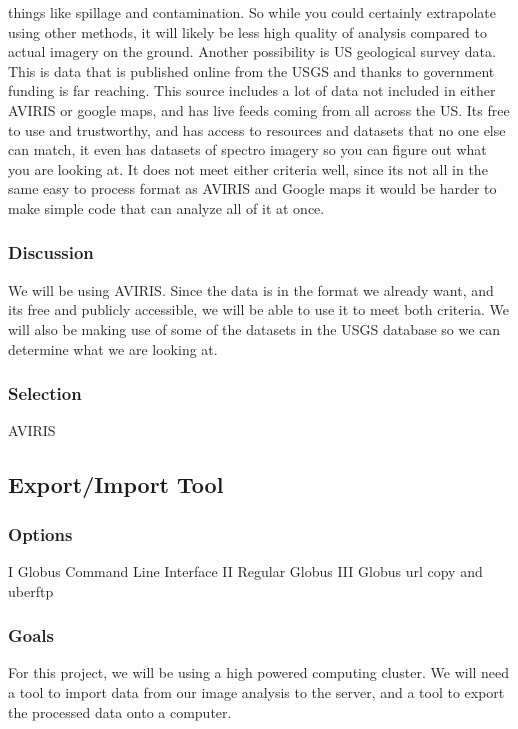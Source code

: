 \documentclass[10pt,draftclsnofoot,onecolumn,journal,compsoc]{IEEEtran}
\begin{document}
things like spillage and contamination. So while you could certainly extrapolate using other methods, it will
likely be less high quality of analysis compared to actual imagery on the ground.
Another possibility is US geological survey data. This is data that is published online from the USGS and
thanks to government funding is far reaching. This source includes a lot of data not included in either AVIRIS or
google maps, and has live feeds coming from all across the US. Its free to use and trustworthy, and has access to
resources and datasets that no one else can match, it even has datasets of spectro imagery so you can figure out
what you are looking at. It does not meet either criteria well, since its not all in the same easy to process format
as AVIRIS and Google maps it would be harder to make simple code that can analyze all of it at once. \cite{2}

\subsubsection{Discussion}
We will be using AVIRIS. Since the data is in the format we already want, and its free and publicly accessible,
we will be able to use it to meet both criteria. We will also be making use of some of the datasets in the USGS
database so we can determine what we are looking at.

\subsubsection{Selection}
\noindent AVIRIS

\subsection{Export/Import Tool}

\subsubsection{Options}
\noindent I Globus Command Line Interface \newline
\noindent II Regular Globus \newline
\noindent III Globus url copy and uberftp

\subsubsection{Goals}
\noindent For this project, we will be using a high powered computing cluster. We will need a tool to import data from
our image analysis to the server, and a tool to export the processed data onto a computer.
\end{document}
